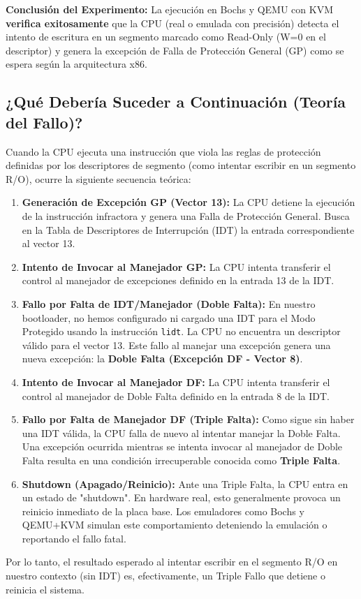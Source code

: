   

\textbf{Conclusión del Experimento:} La ejecución en Bochs y QEMU con KVM \textbf{verifica exitosamente} que la CPU (real o emulada con precisión) detecta el intento de escritura en un segmento marcado como Read-Only (W=0 en el descriptor) y genera la excepción de Falla de Protección General (GP) como se espera según la arquitectura x86.

\subsection{¿Qué Debería Suceder a Continuación (Teoría del Fallo)?}

Cuando la CPU ejecuta una instrucción que viola las reglas de protección definidas por los descriptores de segmento (como intentar escribir en un segmento R/O), ocurre la siguiente secuencia teórica:
\begin{enumerate}
    \item \textbf{Generación de Excepción GP (Vector 13):} La CPU detiene la ejecución de la instrucción infractora y genera una Falla de Protección General. Busca en la Tabla de Descriptores de Interrupción (IDT) la entrada correspondiente al vector 13.
    \item \textbf{Intento de Invocar al Manejador GP:} La CPU intenta transferir el control al manejador de excepciones definido en la entrada 13 de la IDT.
    \item \textbf{Fallo por Falta de IDT/Manejador (Doble Falta):} En nuestro bootloader, no hemos configurado ni cargado una IDT para el Modo Protegido usando la instrucción \texttt{lidt}. La CPU no encuentra un descriptor válido para el vector 13. Este fallo al manejar una excepción genera una nueva excepción: la \textbf{Doble Falta (Excepción DF - Vector 8)}.
    \item \textbf{Intento de Invocar al Manejador DF:} La CPU intenta transferir el control al manejador de Doble Falta definido en la entrada 8 de la IDT.
    \item \textbf{Fallo por Falta de Manejador DF (Triple Falta):} Como sigue sin haber una IDT válida, la CPU falla de nuevo al intentar manejar la Doble Falta. Una excepción ocurrida mientras se intenta invocar al manejador de Doble Falta resulta en una condición irrecuperable conocida como \textbf{Triple Falta}.
    \item \textbf{Shutdown (Apagado/Reinicio):} Ante una Triple Falta, la CPU entra en un estado de "shutdown". En hardware real, esto generalmente provoca un reinicio inmediato de la placa base. Los emuladores como Bochs y QEMU+KVM simulan este comportamiento deteniendo la emulación o reportando el fallo fatal.
\end{enumerate}
Por lo tanto, el resultado esperado al intentar escribir en el segmento R/O en nuestro contexto (sin IDT) es, efectivamente, un Triple Fallo que detiene o reinicia el sistema.

